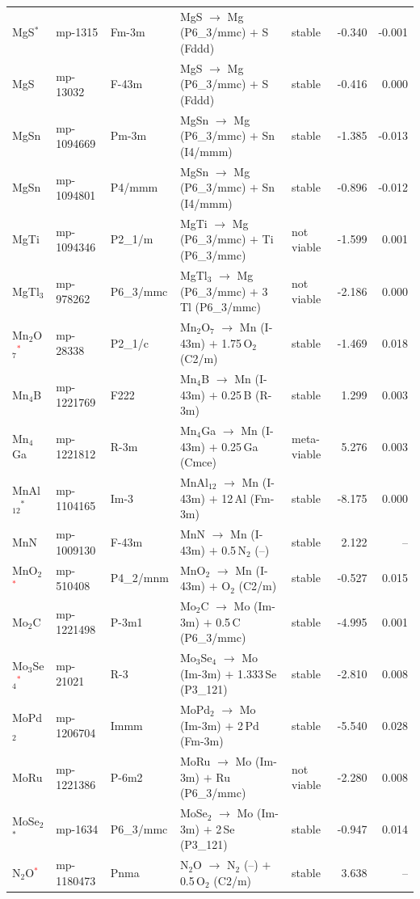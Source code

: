 \begin{longtable}{@{}ll l@{\hspace{4pt}} p{4.6cm} l@{\hspace{4pt}} rr@{}}
MgS$^*$ & mp-1315 & Fm-3m & MgS $\to$ Mg (P6\_3/mmc) $+$ S (Fddd) & stable & -0.340 & -0.001 \\
MgS & mp-13032 & F-43m & MgS $\to$ Mg (P6\_3/mmc) $+$ S (Fddd) & stable & -0.416 & 0.000 \\
MgSn & mp-1094669 & Pm-3m & MgSn $\to$ Mg (P6\_3/mmc) $+$ Sn (I4/mmm) & stable & -1.385 & -0.013 \\
MgSn & mp-1094801 & P4/mmm & MgSn $\to$ Mg (P6\_3/mmc) $+$ Sn (I4/mmm) & stable & -0.896 & -0.012 \\
MgTi & mp-1094346 & P2\_1/m & MgTi $\to$ Mg (P6\_3/mmc) $+$ Ti (P6\_3/mmc) & not viable & -1.599 & 0.001 \\
MgTl$_{3}$ & mp-978262 & P6\_3/mmc & MgTl$_{3}$ $\to$ Mg (P6\_3/mmc) $+$ 3\,Tl (P6\_3/mmc) & not viable & -2.186 & 0.000 \\
Mn$_{2}$O$_{7}$\textcolor{red}{$^*$} & mp-28338 & P2\_1/c & Mn$_{2}$O$_{7}$ $\to$ Mn (I-43m) $+$ 1.75\,O$_{2}$ (C2/m) & stable & -1.469 & 0.018 \\
Mn$_{4}$B & mp-1221769 & F222 & Mn$_{4}$B $\to$ Mn (I-43m) $+$ 0.25\,B (R-3m) & stable & 1.299 & 0.003 \\
Mn$_{4}$Ga & mp-1221812 & R-3m & Mn$_{4}$Ga $\to$ Mn (I-43m) $+$ 0.25\,Ga (Cmce) & meta-viable & 5.276 & 0.003 \\
MnAl$_{12}$$^*$ & mp-1104165 & Im-3 & MnAl$_{12}$ $\to$ Mn (I-43m) $+$ 12\,Al (Fm-3m) & stable & -8.175 & 0.000 \\
MnN & mp-1009130 & F-43m & MnN $\to$ Mn (I-43m) $+$ 0.5\,N$_{2}$ (--) & stable & 2.122 & -- \\
MnO$_{2}$\textcolor{red}{$^*$} & mp-510408 & P4\_2/mnm & MnO$_{2}$ $\to$ Mn (I-43m) $+$ O$_{2}$ (C2/m) & stable & -0.527 & 0.015 \\
Mo$_{2}$C & mp-1221498 & P-3m1 & Mo$_{2}$C $\to$ Mo (Im-3m) $+$ 0.5\,C (P6\_3/mmc) & stable & -4.995 & 0.001 \\
Mo$_{3}$Se$_{4}$\textcolor{red}{$^*$} & mp-21021 & R-3 & Mo$_{3}$Se$_{4}$ $\to$ Mo (Im-3m) $+$ 1.333\,Se (P3\_121) & stable & -2.810 & 0.008 \\
MoPd$_{2}$ & mp-1206704 & Immm & MoPd$_{2}$ $\to$ Mo (Im-3m) $+$ 2\,Pd (Fm-3m) & stable & -5.540 & 0.028 \\
MoRu & mp-1221386 & P-6m2 & MoRu $\to$ Mo (Im-3m) $+$ Ru (P6\_3/mmc) & not viable & -2.280 & 0.008 \\
MoSe$_{2}$$^*$ & mp-1634 & P6\_3/mmc & MoSe$_{2}$ $\to$ Mo (Im-3m) $+$ 2\,Se (P3\_121) & stable & -0.947 & 0.014 \\
N$_{2}$O\textcolor{red}{$^*$} & mp-1180473 & Pnma & N$_{2}$O $\to$ N$_{2}$ (--) $+$ 0.5\,O$_{2}$ (C2/m) & stable & 3.638 & -- \\

\end{longtable}

